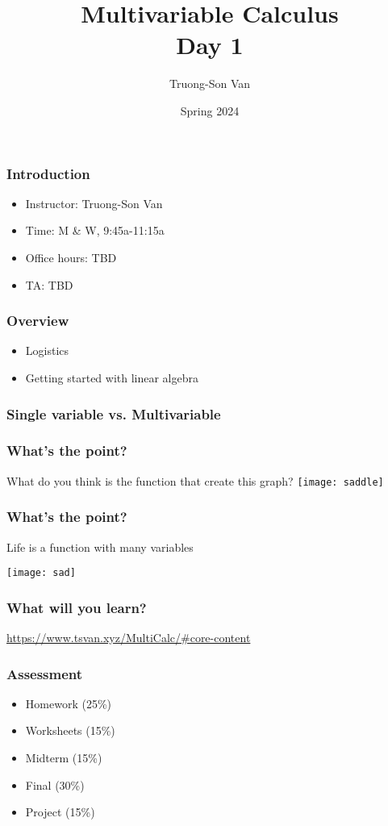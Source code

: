 \documentclass[aspectratio=169]{beamer}
\title{ Multivariable Calculus \\ Day 1}
\institute{Fulbright University Vietnam}
\author{Truong-Son Van}
\date{Spring 2024}
\begin{document}
\maketitle


\begin{frame}
    \frametitle{Introduction}
    \begin{itemize}
        \item Instructor: Truong-Son Van
        \item Time: M \& W, 9:45a-11:15a
        \item Office hours: TBD 
        \item TA:  TBD
    \end{itemize}
\end{frame}

\begin{frame}
    \frametitle{Overview}
    \begin{itemize}
        \item Logistics
        \item Getting started with linear algebra
    \end{itemize}
\end{frame}

\begin{frame}
    \frametitle{Single variable vs. Multivariable}

\end{frame}

\begin{frame}
    \frametitle{What's the point?}
    What do you think is the function that create this graph?
    \centering
    \texttt{[image: saddle]}
\end{frame}

\begin{frame}
    \frametitle{What's the point?}
    Life is a function with many variables \pause

    \centering
    \texttt{[image: sad]}
\end{frame}

\begin{frame}
    \frametitle{What will you learn?}
    \url{https://www.tsvan.xyz/MultiCalc/\#core-content}
\end{frame}


\begin{frame}
    \frametitle{Assessment}
    \begin{itemize}
        \item Homework (25\%)
        \item Worksheets (15\%)
        \item Midterm (15\%)
        \item Final (30\%)
        \item Project (15\%)
    \end{itemize}
\end{frame}
\end{document}

